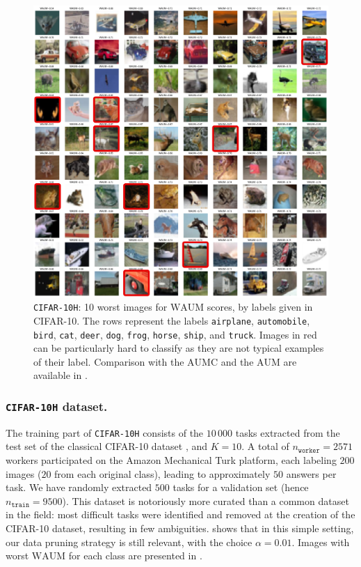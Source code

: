 \begin{figure}[tbh]
    \centering
    \includegraphics[width=0.9\columnwidth]{images/lowest_waum_C10H_yang_Yang_True_red.pdf}
    \caption{\texttt{CIFAR-10H}: 10 worst images for $\mathrm{WAUM}$ scores, by labels given in CIFAR-10. The rows represent the labels \texttt{airplane}, \texttt{automobile}, \texttt{bird}, \texttt{cat}, \texttt{deer}, \texttt{dog}, \texttt{frog}, \texttt{horse}, \texttt{ship}, and \texttt{truck}. Images in red can be particularly hard to classify as they are not typical examples of their label. Comparison with the $\mathrm{AUMC}$ and the $\mathrm{AUM}$ are available in  .}
    \label{fig:worse_C10H}
\end{figure}

\subsubsection*{\texttt{CIFAR-10H} dataset.} The training part of \texttt{CIFAR-10H} consists of the $10\,000$ tasks extracted from the test set of the classical CIFAR-10 dataset \citep{krizhevsky2009learning}, and $K=10$.
A total of $n_\texttt{worker}=2571$ workers participated on the Amazon Mechanical Turk platform, each labeling $200$ images ($20$ from each original class), leading to approximately $50$ answers per task.
We have randomly extracted $500$ tasks for a validation set (hence $n_{\texttt{train}}=9500$).
This dataset is notoriously more curated \citep{aitchison2020statistical} than a common dataset in the field: most difficult tasks were identified and removed at the creation of the CIFAR-10 dataset, resulting in few ambiguities.
 shows that in this simple setting, our data pruning strategy is still relevant, with the choice $\alpha=0.01$. Images with worst $\mathrm{WAUM}$ for each class are presented in .

